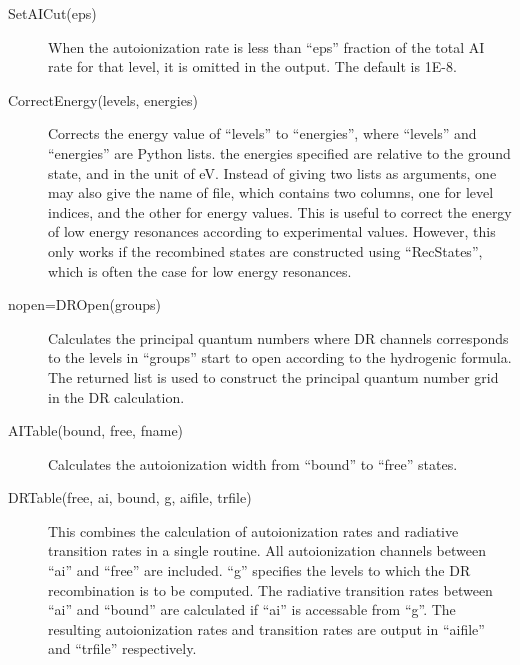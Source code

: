 \documentclass[12pt]{article}
\begin{document}
\begin{description}
\item[SetAICut(eps)] When the autoionization rate is less than ``eps''
fraction of the total AI rate for that level, it is omitted in the output. The
default is 1E-8.

\item[CorrectEnergy(levels, energies)]
Corrects the energy value of ``levels'' to ``energies'', where ``levels'' and
``energies'' are Python lists. the energies specified are relative to the
ground state, and in the unit of eV. Instead of giving two lists as arguments,
one may also give the name of file, which contains two columns, one for level
indices, and the other for energy values. This is useful to correct the energy
of low energy resonances according to experimental values. However, this only
works if the recombined states are constructed using ``RecStates'', which is
often the case for low energy resonances. 

\item[nopen=DROpen(groups)]
Calculates the principal quantum numbers where DR channels corresponds to the
levels in ``groups'' start to open according to the hydrogenic formula. The
returned list is used to construct the 
principal quantum number grid in the DR calculation. 

\item[AITable(bound, free, fname)] Calculates the autoionization width from
``bound'' to ``free'' states. 

\item[DRTable(free, ai, bound, g, aifile, trfile)] This combines the
calculation of autoionization rates and radiative transition rates in a single
routine. All autoionization channels between ``ai'' and ``free'' are
included. ``g'' specifies the levels to which the DR recombination is to be
computed. The radiative transition rates between ``ai'' and ``bound'' are
calculated if ``ai'' is accessable from ``g''. The resulting autoionization
rates and transition rates are output in ``aifile'' and ``trfile''
respectively. 

\end{description}
\end{document}
